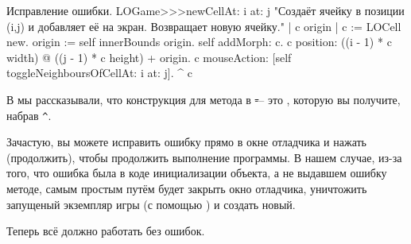 \documentclass[a4paper,10pt,twoside]{book}
\begin{document}
\begin{method}{Исправление ошибки.}
LOGame>>>newCellAt: i at: j
   "Создаёт ячейку в позиции (i,j) и добавляет её на экран. Возвращает новую ячейку."
   | c origin |
   c := LOCell new.
   origin := self innerBounds origin.
   self addMorph: c.
   c position: ((i - 1) * c width) @ ((j - 1) * c height) + origin.
   c mouseAction: [self toggleNeighboursOfCellAt: i at: j].
   ^ c
\end{method}

\noindent
В  мы рассказывали, что конструкция для   метода в \st --- это \ct{^}, которую вы получите, набрав \verb|^|.

Зачастую, вы можете исправить ошибку прямо в окне отладчика и нажать  (продолжить), чтобы продолжить выполнение программы.
В нашем случае, из-за того, что ошибка была в коде инициализации объекта, а не выдавшем ошибку методе, самым простым путём будет закрыть окно отладчика, уничтожить запущеный экземпляр игры (с помощью ) и создать новый.


Теперь всё должно работать без ошибок.

\end{document}
